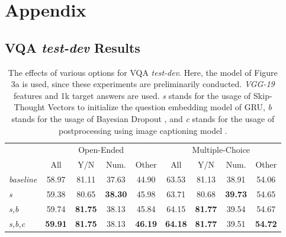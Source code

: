 \documentclass{article}
\begin{document}



\setcounter{section}{0}
\renewcommand\theHsection{\Alph{section}}
\renewcommand\thesection{\Alph{section}}
\renewcommand\thesubsection{\thesection.\arabic{subsection}}

\clearpage{}\section{Appendix}

\subsection{VQA \textit{test-dev} Results}

\begin{table}[h]
\caption{The effects of various options for VQA \textit{test-dev}. Here, the model of Figure 3a is used, since these experiments are preliminarily conducted. \textit{VGG-19} features and 1k target answers are used. \textit{s} stands for the usage of Skip-Thought Vectors \cite{Kiros2015} to initialize the question embedding model of GRU, \textit{b} stands for the usage of Bayesian Dropout \cite{Gal2015}, and \textit{c} stands for the usage of postprocessing using image captioning model \cite{Karpathy}.}
\label{tab:options}
\centering
\begin{tabular}{lcccccccc}
\toprule
& \multicolumn{4}{c}{Open-Ended} & \multicolumn{4}{c}{Multiple-Choice}\\
\cmidrule{2-5}
\cmidrule{6-9}
 & All & Y/N & Num. & Other & All & Y/N & Num. & Other\\
\midrule
  \textit{baseline} & 
     58.97 & 81.11 & 37.63 & 44.90 & 63.53 & 81.13 & 38.91 & 54.06 \\
  \textit{s} & 
     59.38 & 80.65 & \textbf{38.30} & 45.98 & 63.71 & 80.68 & \textbf{39.73} & 54.65 \\
  \textit{s,b} & 
     59.74 & \textbf{81.75} & 38.13 & 45.84 & 64.15 & \textbf{81.77} & 39.54 & 54.67 \\
  \textit{s,b,c} & 
     \textbf{59.91} & \textbf{81.75} & 38.13 & \textbf{46.19} & \textbf{64.18} & \textbf{81.77} & 39.51 & \textbf{54.72} \\
\bottomrule
\end{tabular}
\end{table}
\end{document}
